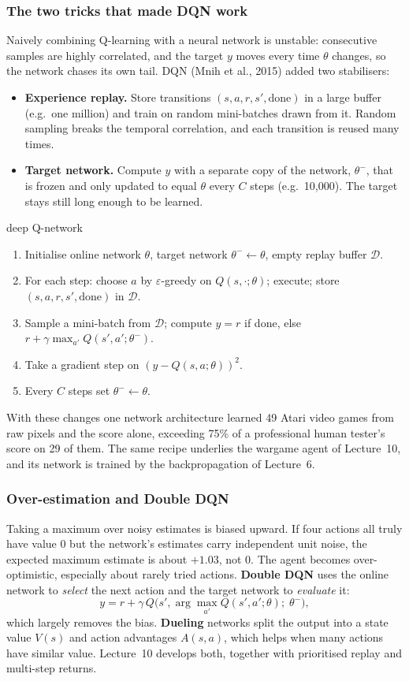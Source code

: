 \documentclass[11pt]{article}
\begin{document}
\subsubsection{The two tricks that made DQN work}
Naively combining Q-learning with a neural network is unstable: consecutive samples are highly correlated, and the target $y$ moves every time $\theta$ changes, so the network chases its own tail. DQN (Mnih et al., 2015) added two stabilisers:
\begin{itemize}
\item \textbf{Experience replay.} Store transitions $(s,a,r,s',\text{done})$ in a large buffer (e.g.\ one million) and train on random mini-batches drawn from it. Random sampling breaks the temporal correlation, and each transition is reused many times.
\item \textbf{Target network.} Compute $y$ with a separate copy of the network, $\theta^-$, that is frozen and only updated to equal $\theta$ every $C$ steps (e.g.\ 10,000). The target stays still long enough to be learned.
\end{itemize}
\begin{algo}{deep Q-network}
\begin{enumerate}[leftmargin=1.5em]
\item Initialise online network $\theta$, target network $\theta^-\leftarrow\theta$, empty replay buffer $\mathcal D$.
\item For each step: choose $a$ by $\varepsilon$-greedy on $Q(s,\cdot;\theta)$; execute; store $(s,a,r,s',\text{done})$ in $\mathcal D$.
\item Sample a mini-batch from $\mathcal D$; compute $y=r$ if done, else $r+\gamma\max_{a'}Q(s',a';\theta^-)$.
\item Take a gradient step on $(y-Q(s,a;\theta))^2$.
\item Every $C$ steps set $\theta^-\leftarrow\theta$.
\end{enumerate}
\end{algo}
With these changes one network architecture learned 49 Atari video games from raw pixels and the score alone, exceeding 75\% of a professional human tester's score on 29 of them. The same recipe underlies the wargame agent of Lecture~10, and its network is trained by the backpropagation of Lecture~6.

\subsubsection{Over-estimation and Double DQN}
Taking a maximum over noisy estimates is biased upward. If four actions all truly have value 0 but the network's estimates carry independent unit noise, the expected maximum estimate is about $+1.03$, not 0. The agent becomes over-optimistic, especially about rarely tried actions. \textbf{Double DQN} uses the online network to \emph{select} the next action and the target network to \emph{evaluate} it:
\[y=r+\gamma\,Q\big(s',\arg\max_{a'}Q(s',a';\theta);\;\theta^-\big),\]
which largely removes the bias. \textbf{Dueling} networks split the output into a state value $V(s)$ and action advantages $A(s,a)$, which helps when many actions have similar value. Lecture~10 develops both, together with prioritised replay and multi-step returns.
\end{document}
